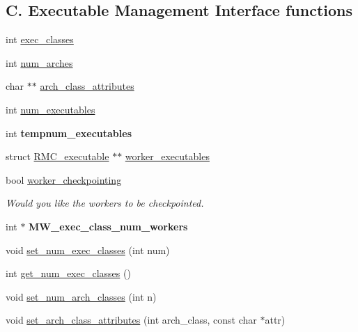 \subsection*{C. Executable Management Interface functions}
\begin{DoxyCompactItemize}
\item 
int \hyperlink{classMWRMComm_adc0160ae06e86f3a9287b20d0a2f50f4}{exec\+\_\+classes}
\item 
int \hyperlink{classMWRMComm_a34760512eb56356d6581e18475f77050}{num\+\_\+arches}
\item 
char $\ast$$\ast$ \hyperlink{classMWRMComm_a0e22f07e5fbc90f5fc746c4c1195067b}{arch\+\_\+class\+\_\+attributes}
\item 
int \hyperlink{classMWRMComm_acf783eaa2bac49d0cca1b403725d8f66}{num\+\_\+executables}
\item 
\mbox{\label{classMWRMComm_aa81c7090bff5f936a6e0eeb5679a7ee7}} 
int {\bfseries tempnum\+\_\+executables}
\item 
struct \hyperlink{structRMC__executable}{R\+M\+C\+\_\+executable} $\ast$$\ast$ \hyperlink{classMWRMComm_af444e4e9104d9a9b7ee35e3e4d025bb6}{worker\+\_\+executables}
\item 
\mbox{\label{classMWRMComm_ad51b57f12bcd01fbecb78c0c060df60d}} 
bool \hyperlink{classMWRMComm_ad51b57f12bcd01fbecb78c0c060df60d}{worker\+\_\+checkpointing}
\begin{DoxyCompactList}\small\item\em Would you like the workers to be checkpointed. \end{DoxyCompactList}\item 
\mbox{\label{classMWRMComm_ac81fec5e34fee7d872fcdacf9ab3b01a}} 
int $\ast$ {\bfseries M\+W\+\_\+exec\+\_\+class\+\_\+num\+\_\+workers}
\item 
void \hyperlink{classMWRMComm_a78424915f8da7195a01008ae5977da32}{set\+\_\+num\+\_\+exec\+\_\+classes} (int num)
\item 
int \hyperlink{classMWRMComm_ac74cbe518e434e9796eba40687a3ec6b}{get\+\_\+num\+\_\+exec\+\_\+classes} ()
\item 
void \hyperlink{classMWRMComm_a37e1550401acab038a3f1d94f8c50669}{set\+\_\+num\+\_\+arch\+\_\+classes} (int n)
\item 
void \hyperlink{classMWRMComm_acc1a551c808ef615fd02992f0ab9fffb}{set\+\_\+arch\+\_\+class\+\_\+attributes} (int arch\+\_\+class, const char $\ast$attr)

\end{DoxyCompactItemize}
